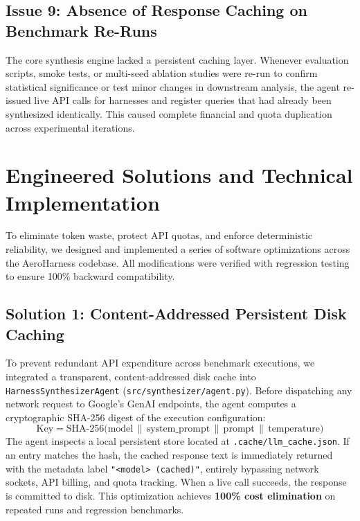 \documentclass[11pt,a4paper]{article}
\begin{document}
\subsection{Issue 9: Absence of Response Caching on Benchmark Re-Runs}
The core synthesis engine lacked a persistent caching layer. Whenever evaluation scripts, smoke tests, or multi-seed ablation studies were re-run to confirm statistical significance or test minor changes in downstream analysis, the agent re-issued live API calls for harnesses and register queries that had already been synthesized identically. This caused complete financial and quota duplication across experimental iterations.

\section{Engineered Solutions and Technical Implementation}

To eliminate token waste, protect API quotas, and enforce deterministic reliability, we designed and implemented a series of software optimizations across the AeroHarness codebase. All modifications were verified with regression testing to ensure 100\% backward compatibility.

\subsection{Solution 1: Content-Addressed Persistent Disk Caching}
To prevent redundant API expenditure across benchmark executions, we integrated a transparent, content-addressed disk cache into \texttt{HarnessSynthesizerAgent} (\texttt{src/synthesizer/agent.py}). Before dispatching any network request to Google's GenAI endpoints, the agent computes a cryptographic SHA-256 digest of the execution configuration:
\begin{equation}
\text{Key} = \text{SHA-256}\Big(\text{model} \,\|\, \text{system\_prompt} \,\|\, \text{prompt} \,\|\, \text{temperature}\Big)
\end{equation}
The agent inspects a local persistent store located at \texttt{.cache/llm\_cache.json}. If an entry matches the hash, the cached response text is immediately returned with the metadata label \texttt{"<model> (cached)"}, entirely bypassing network sockets, API billing, and quota tracking. When a live call succeeds, the response is committed to disk. This optimization achieves \textbf{100\% cost elimination} on repeated runs and regression benchmarks.
\end{document}
